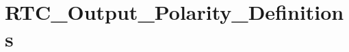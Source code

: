 \hypertarget{group___r_t_c___output___polarity___definitions}{\section{R\-T\-C\-\_\-\-Output\-\_\-\-Polarity\-\_\-\-Definitions}
\label{group___r_t_c___output___polarity___definitions}
}
